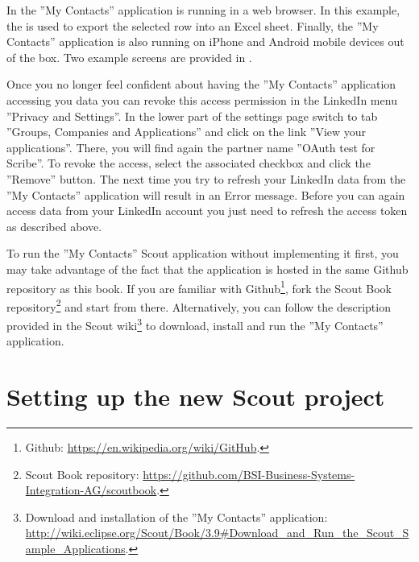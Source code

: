 \documentclass[a4paper,10pt,twoside]{book}
\begin{document}
In  the ''My Contacts'' application is running in a web browser. 
In this example, the  is used to export the selected row into an Excel sheet. 
Finally, the ''My Contacts'' application is also running on iPhone and Android mobile devices out of the box. 
Two example screens are provided in .

Once you no longer feel confident about having the ''My Contacts'' application accessing you data you can revoke this access permission in the LinkedIn menu ''Privacy and Settings''. 
In the lower part of the settings page switch to tab ''Groups, Companies and Applications'' and click on the link ''View your applications''. 
There, you will find again the partner name ''OAuth test for Scribe''. 
To revoke the access, select the associated checkbox and click the ''Remove'' button. 
The next time you try to refresh your LinkedIn data from the ''My Contacts'' application will result in an Error message. 
Before you can again access data from your LinkedIn account you just need to refresh the access token as described above.

To run the ''My Contacts'' Scout application without implementing it first, you may take advantage of the fact that the application is hosted in the same Github repository as this book.
If you are familiar with Github\footnote{
Github: \url{https://en.wikipedia.org/wiki/GitHub}.
}, 
fork the Scout Book repository\footnote{
Scout Book repository: \url{https://github.com/BSI-Business-Systems-Integration-AG/scoutbook}.
} 
and start from there.
Alternatively, you can follow the description provided in the Scout wiki\footnote{
Download and installation of the ''My Contacts'' application: \url{http://wiki.eclipse.org/Scout/Book/3.9\#Download_and_Run_the_Scout_Sample_Applications}.
}
to download, install and run the ''My Contacts'' application.

\section{Setting up the new Scout project}
\end{document}
